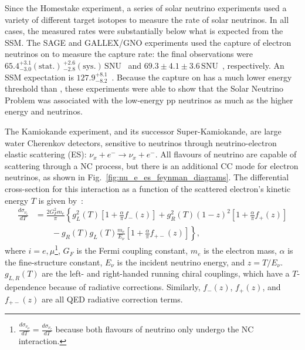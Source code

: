Since the Homestake experiment, a series of solar neutrino experiments used a variety of different target isotopes to measure the rate of solar neutrinos. In all cases, the measured rates were substantially below what is expected from the SSM. The SAGE and GALLEX/GNO experiments used the capture of electron neutrinos on  to measure the capture rate: the final observations were $65.4^{+3.1}_{-3.0}(\mathrm{stat.})\,^{+2.6}_{-2.8}(\mathrm{sys.})\,\mathrm{ SNU}$~\cite{abdurashitovMeasurementSolarNeutrino2009} and $69.3\pm4.1\pm3.6\,\mathrm{ SNU}$~\cite{altmannCompleteResultsFive2005}, respectively. An SSM expectation is $127.9^{+8.1}_{-8.2}$~\cite{pena-garaySolarNeutrinosSolar2008}. Because the capture on  has a much lower energy threshold than , these experiments were able to show that the Solar Neutrino Problem was associated with the low-energy pp neutrinos as much as the higher energy \beight{} and  neutrinos.

The Kamiokande experiment, and its successor Super-Kamiokande, are large water Cherenkov detectors, sensitive to neutrinos through neutrino-electron elastic scattering (ES): $\nu_{x} + e^{-}\to\nu_{x} + e^{-}$. All flavours of neutrino are capable of scattering through a NC process, but there is an additional CC mode for electron neutrinos, as shown in Fig.~\ref{fig:nu_e_es_feynman_diagrams}. The differential cross-section for this interaction as a function of the scattered electron's kinetic energy $T$ is given by~\cite{bahcallSolarNeutrinosRadiative1995}: %
\begin{align}\label{eq:enu_es_xsec}
    \frac{d\sigma_{\nu_{i}}}{dT} &= \frac{2G_{F}^{2}m_{e}}{\pi}\left\{
        g_{L}^{2}(T)\left[
            1 + \frac{\alpha}{\pi}f_{-}(z)
        \right]
        + g_{R}^{2}(T)(1-z)^{2}\left[
            1 + \frac{\alpha}{\pi}f_{+}(z)
        \right]\right.\nonumber\\
        &\qquad \left. {}
        -g_{R}(T)g_{L}(T)\frac{m_{e}}{E_{\nu}}\left[
            1 + \frac{\alpha}{\pi}f_{+-}(z)
        \right]
    \right\},
\end{align}
where $i = e, \mu$\footnote{
    $\frac{d\sigma_{\nu_{\mu}}}{dT} = \frac{d\sigma_{\nu_{\tau}}}{dT}$ because both flavours of neutrino only undergo the NC interaction.
}, $G_{F}$ is the Fermi coupling constant, $m_{e}$ is the electron mass, $\alpha$ is the fine-structure constant, $E_{\nu}$ is the incident neutrino energy, and $z = T/E_{\nu}$. $g_{L,R}(T)$ are the left- and right-handed running chiral couplings, which have a $T$-dependence because of radiative corrections. Similarly, $f_{-}(z)$, $f_{+}(z)$, and $f_{+-}(z)$ are all QED radiative correction terms. 

